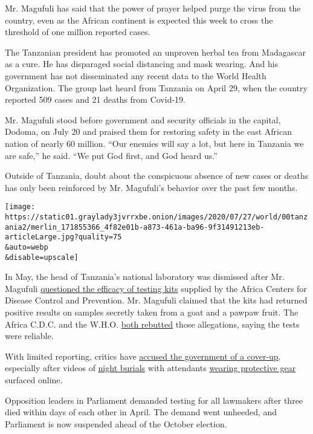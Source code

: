 Mr. Magufuli has said that the power of prayer helped purge the virus
from the country, even as the African continent is expected this week to
cross the threshold of one million reported cases.

The Tanzanian president has promoted an unproven herbal tea from
Madagascar as a cure. He has disparaged social distancing and mask
wearing. And his government has not disseminated any recent data to the
World Health Organization. The group last heard from Tanzania on April
29, when the country reported 509 cases and 21 deaths from Covid-19.

Mr. Magufuli stood before government and security officials in the
capital, Dodoma, on July 20 and praised them for restoring safety in the
east African nation of nearly 60 million. ``Our enemies will say a lot,
but here in Tanzania we are safe,'' he said. ``We put God first, and God
heard us.''

Outside of Tanzania, doubt about the conspicuous absence of new cases or
deaths has only been reinforced by Mr. Magufuli's behavior over the past
few months.

\texttt{[image: https://static01.graylady3jvrrxbe.onion/images/2020/07/27/world/00tanzania2/merlin\_171855366\_4f82e01b-a873-461a-ba96-9f31491213eb-articleLarge.jpg?quality=75\\\&auto=webp\\\&disable=upscale]}

In May, the head of Tanzania's national laboratory was dismissed after
Mr. Magufuli
\href{https://www.youtube.com/watch?v=DbSZd8oyaGE}{questioned the
efficacy of testing kits} supplied by the Africa Centers for Disease
Control and Prevention. Mr. Magufuli claimed that the kits had returned
positive results on samples secretly taken from a goat and a pawpaw
fruit. The Africa C.D.C. and the W.H.O.
\href{https://www.youtube.com/watch?time_continue=3\&v=cwrW2Ksg-6Q\&feature=emb_logo}{both
rebutted} those allegations, saying the tests were reliable.

With limited reporting, critics have
\href{https://medium.com/@actbrief/president-magufuli-must-commit-to-full-transparency-334919f76260}{accused
the government of a cover-up}, especially after videos of
\href{https://twitter.com/fatma_karume/status/1254657286179520517}{night
burials} with attendants
\href{https://twitter.com/ngurumo/status/1255204084182810629}{wearing
protective gear} surfaced online.

Opposition leaders in Parliament demanded testing for all lawmakers
after three died within days of each other in April. The demand went
unheeded, and Parliament is now suspended ahead of the October election.

